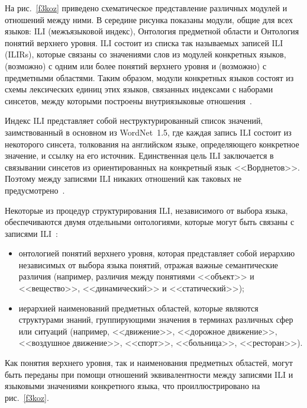 \begin{multicols}{2}
     На рис.~\ref{f3koz} приведено схематическое представление различных 
модулей и отношений между ними. В середине рисунка показаны модули, 
общие для всех языков: ILI (межъязыковой индекс), Онтология предметной 
области и Онтология понятий верхнего уровня. ILI состоит из списка так 
называемых записей ILI (ILIRs), которые связаны со значениями слов из 
модулей конкретных языков, (возможно) с одним или более понятий верхнего 
уровня и (возможно) с предметными областями. Таким образом, модули 
конкретных языков состоят из схемы лексических единиц этих языков, 
связанных индексами с наборами синсетов, между которыми построены 
внутриязыковые отношения~\cite{4koz, 7koz}. 
     
Индекс ILI представляет собой неструктурированный список значений, 
заимствованный в основном из WordNet~1.5, где каждая запись ILI %
 со\-стоит из 
некоторого синсета, толкования на английском языке, определяющего 
конкретное значение, и ссылку на его источник. Единственная цель ILI 
заключается в связывании синсетов из ориентированных на конкретный язык 
<<Ворднетов>>. Поэтому между записями ILI  никаких отношений как 
таковых не предусмотрено~\cite{4koz}. 
     
     Некоторые из процедур структурирования ILI, независимого от выбора 
языка, обеспечиваются двумя отдельными онтологиями, которые могут быть 
связаны с записями ILI~\cite{4koz, 9koz}: 
     \begin{itemize}
\item онтологией понятий верхнего уровня, которая представляет собой 
иерархию независимых от выбора языка понятий, отражая важные 
семантические различия (например,  различия между понятиями 
<<объект>> и <<вещество>>, <<динамический>> и <<статический>>); 
\item иерархией наименований предметных областей, которые являются 
структурами знаний, группирующими значения в терминах различных 
сфер или ситуаций (например, <<движение>>, <<дорожное 
движение>>, <<воздушное движение>>, <<спорт>>, <<больница>>, 
<<ресторан>>).
     \end{itemize}
     
     Как понятия верхнего уровня, так и  наименования предметных областей,  
могут быть переданы при помощи отношений эквивалентности между 
записями ILI и языковыми значениями конкретного языка, что 
проиллюстрировано на рис.~\ref{f3koz}. 


\begin{figure*} %
\vspace*{1pt}
\begin{center}
\mbox{%
\epsfxsize=163.942mm
}
\end{center}
\vspace*{-9pt}
\end{figure*}


\end{multicols}
